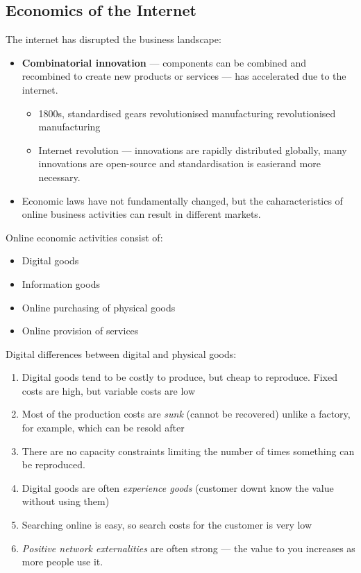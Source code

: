 \documentclass[11pt,a4paper,titlepage,dvipsnames,cmyk]{scrartcl}
\begin{document}
\subsection{Economics of the Internet}
The internet has disrupted the business landscape:
\begin{itemize}
    \item \textbf{Combinatorial innovation} --- components can be combined and recombined to create new products or services --- has accelerated due to the internet.
    \begin{itemize}
        \item 1800s, standardised gears revolutionised manufacturing revolutionised manufacturing
        \item Internet revolution --- innovations are rapidly distributed globally, many innovations are open-source and standardisation is easierand more necessary.
    \end{itemize}
    \item Economic laws have not fundamentally changed, but the caharacteristics of online business activities can result in different markets.
\end{itemize}

Online economic activities consist of:
\begin{itemize}
    \item Digital goods
    \item Information goods
    \item Online purchasing of physical goods
    \item Online provision of services
\end{itemize}

Digital differences between digital and physical goods:
\begin{enumerate}
\item Digital goods tend to be costly to produce, but cheap to reproduce. Fixed costs are high, but variable costs are low
\item Most of the production costs are \textit{sunk} (cannot be recovered) unlike a factory, for example, which can be resold after
\item There are no capacity constraints limiting the number of times something can be reproduced.
\item Digital goods are often \textit{experience goods} (customer downt know the value without using them)
\item Searching online is easy, so search costs for the customer is very low
\item \textit{Positive network externalities} are often strong --- the value to you increases as more people use it.
\end{enumerate}
\end{document}
